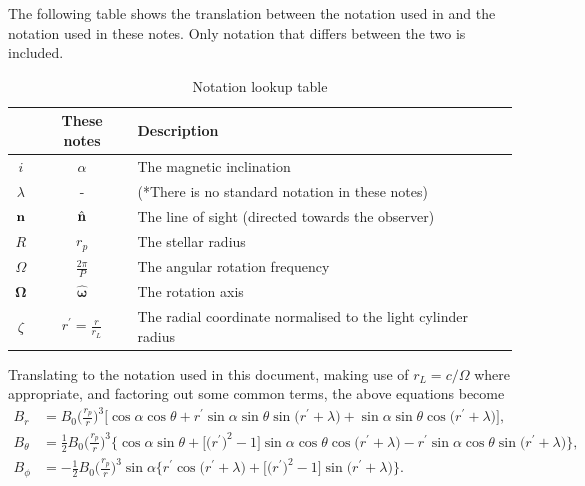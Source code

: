 \documentclass{book}
\begin{document}
The following table shows the translation between the notation used in \citet{Barnard1986} and the notation used in these notes.
Only notation that differs between the two is included.
\begin{table}[!h]
    \centering
    \caption{Notation lookup table}
    \label{tbl:barnard_notation}
    \begin{tabular}{ccl}
        \citet{Barnard1986} & These notes & Description \\
        \hline
        $i$ & $\alpha$ & The magnetic inclination \\
        $\lambda$ & - & (*There is no standard notation in these notes) \\
        ${\bf n}$ & $\hat{\bf n}$ & The line of sight (directed towards the observer) \\
        $R$ & $r_p$ & The stellar radius \\
        $\Omega$ & $\frac{2\pi}{P}$ & The angular rotation frequency \\
        ${\bm \Omega}$ & $\hat{\bm \omega}$ & The rotation axis \\
        $\zeta$ & $r^\prime = \frac{r}{r_L}$ & The radial coordinate normalised to the light cylinder radius \\
        \hline
    \end{tabular}
\end{table}

Translating to the notation used in this document, making use of $r_L = c/\Omega$ where appropriate, and factoring out some common terms, the above equations become
\begin{equation}
    \begin{aligned}
        B_r &= B_0\bigg(\frac{r_p}{r}\bigg)^3 \bigg[ \cos \alpha \cos \theta +
               r^\prime \sin \alpha \sin \theta \sin\big(r^\prime + \lambda\big) +
               \sin \alpha \sin \theta \cos\big(r^\prime + \lambda\big)\bigg], \\
        B_\theta &= \frac{1}{2}B_0 \bigg(\frac{r_p}{r}\bigg)^3 \bigg\{\cos \alpha \sin \theta +
                    \Big[\big(r^\prime\big)^2 - 1\Big] \sin \alpha \cos \theta \cos\big(r^\prime + \lambda\big) -
                    r^\prime \sin \alpha \cos \theta \sin\big(r^\prime + \lambda\big)\bigg\}, \\
        B_\phi &= -\frac{1}{2} B_0 \bigg(\frac{r_p}{r}\bigg)^3 \sin \alpha \bigg\{r^\prime \cos\big(r^\prime + \lambda\big) +
                  \Big[\big(r^\prime\big)^2 - 1\Big] \sin\big(r^\prime + \lambda\big)\bigg\}.
    \end{aligned}
\end{equation}
\end{document}

